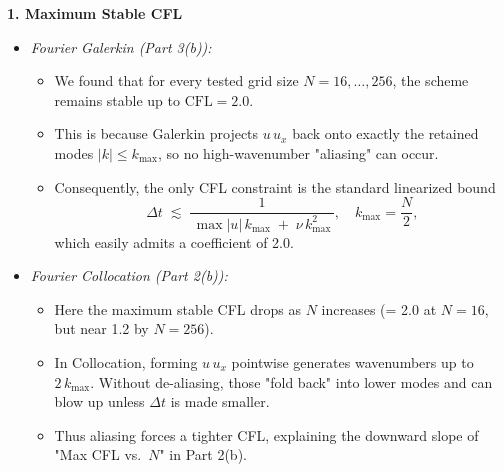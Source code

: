 \documentclass{article}
\begin{document}
\noindent\textbf{1. Maximum Stable CFL}  
\begin{itemize}
  \item \emph{Fourier Galerkin (Part 3(b)):}  
  \begin{itemize}
    \item We found that for every tested grid size $N=16,\dots,256$, the scheme remains stable up to \(\mathrm{CFL}=2.0\).  
    \item This is because Galerkin projects \(u\,u_x\) back onto exactly the retained modes \(\lvert k\rvert\le k_{\max}\), so no high-wavenumber "aliasing" can occur.  
    \item Consequently, the only CFL constraint is the standard linearized bound
    \[
      \Delta t \;\lesssim\; \frac{1}{\,\max|u|\,k_{\max} \;+\;\nu\,k_{\max}^2\,},
      \quad k_{\max}=\frac{N}{2},
    \]
    which easily admits a coefficient of 2.0.
  \end{itemize}

  \item \emph{Fourier Collocation (Part 2(b)):}  
  \begin{itemize}
    \item Here the maximum stable CFL drops as \(N\) increases (= 2.0 at \(N=16\), but near 1.2 by \(N=256\)).  
    \item In Collocation, forming \(u\,u_x\) pointwise generates wavenumbers up to \(2\,k_{\max}\).  Without de-aliasing, those "fold back" into lower modes and can blow up unless \(\Delta t\) is made smaller.  
    \item Thus aliasing forces a tighter CFL, explaining the downward slope of "Max CFL vs.\ $N$" in Part 2(b).
  \end{itemize}
\end{itemize}

\bigskip
\end{document}
